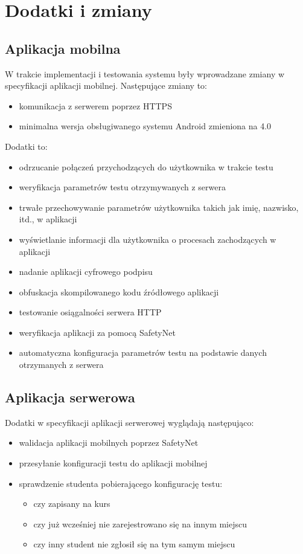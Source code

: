 \documentclass[archivemod, eng]{mgr}
\begin{document}
		\section{Dodatki i zmiany}
		
			\subsection{Aplikacja mobilna}
			W trakcie implementacji i testowania systemu były wprowadzane zmiany w specyfikacji aplikacji mobilnej. Następujące zmiany to:
			\begin{itemize}
				\item komunikacja z serwerem poprzez HTTPS
				\item minimalna wersja obsługiwanego systemu Android zmieniona na 4.0
			\end{itemize}
			Dodatki to:
			\begin{itemize}
				\item odrzucanie połączeń przychodzących do użytkownika w trakcie testu
				\item weryfikacja parametrów testu otrzymywanych z serwera
				\item trwałe przechowywanie parametrów użytkownika takich jak imię, nazwisko, itd., w aplikacji
				\item wyświetlanie informacji dla użytkownika o procesach zachodzących w aplikacji
				\item nadanie aplikacji cyfrowego podpisu
				\item obfuskacja skompilowanego kodu źródłowego aplikacji
				\item testowanie osiągalności serwera HTTP
				\item weryfikacja aplikacji za pomocą SafetyNet
				\item automatyczna konfiguracja parametrów testu na podstawie danych otrzymanych z serwera
			\end{itemize}
		
			\subsection{Aplikacja serwerowa}
			Dodatki w specyfikacji aplikacji serwerowej wyglądają następująco:
			\begin{itemize}
				\item walidacja aplikacji mobilnych poprzez SafetyNet
				\item przesyłanie konfiguracji testu do aplikacji mobilnej
				\item sprawdzenie studenta pobierającego konfigurację testu:
				\begin{itemize}
					\item czy zapisany na kurs
					\item czy już wcześniej nie zarejestrowano się na innym miejscu
					\item czy inny student nie zgłosił się na tym samym miejscu
				\end{itemize}
			\end{itemize}
		
\end{document}
